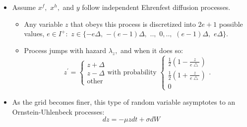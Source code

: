 \documentclass[notes=show]{beamer}
\begin{document}
\begin{frame}%

\begin{flushleft}

\end{flushleft}

\begin{itemize}
\item Assume $x^{f},$ $x^{h},$ and $y$ follow independent Ehrenfest
diffusion processes.

\begin{itemize}
\item Any variable $z$ that obeys this process is discretized into $2e+1$
possible values, $e\in I^{+}:$ $z\in \{-e\Delta ,$ $-(e-1)\Delta ,$ $..,$ $%
0,..,$ $(e-1)\Delta ,$ $e\Delta \}.$

\item Process jumps with hazard $\lambda _{z},$ and when it does so:%
\[
z^{\prime }=\left\{ 
\begin{array}{c}
z+\Delta \\ 
z-\Delta \\ 
\text{other}%
\end{array}%
\right. \text{with probability }\left\{ 
\begin{array}{c}
\frac{1}{2}\left( 1-\frac{z}{e\bigtriangleup }\right) \\ 
\frac{1}{2}\left( 1+\frac{z}{e\bigtriangleup }\right) \\ 
0%
\end{array}%
\right. . 
\]
\end{itemize}

\item As the grid becomes finer, this type of random variable asymptotes to
an Ornstein-Uhlenbeck processes: 
\[
dz=-\mu zdt+\sigma dW 
\]
\end{itemize}

\end{frame}%
\end{document}
